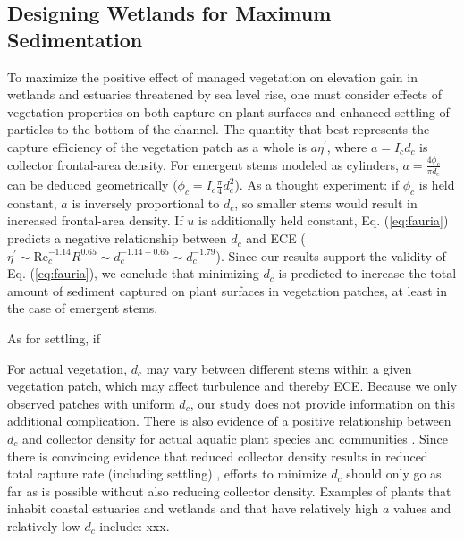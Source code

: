 \documentclass[geosciences,article,submit,moreauthors,pdftex]{Definitions/mdpi}
\newcommand\Rey{\mathrm{Re}}
\begin{document}
\subsection{Designing Wetlands for Maximum Sedimentation}

To maximize the positive effect of managed vegetation on elevation gain in wetlands and estuaries threatened by sea level rise, one must consider effects of vegetation properties on both capture on plant surfaces and enhanced settling of particles to the bottom of the channel. The quantity that best represents the capture efficiency of the vegetation patch as a whole is $a \eta^\prime$, where $a = I_cd_c$ is collector frontal-area density. For emergent stems modeled as cylinders, $a = \frac{4\phi_c}{\pi d_c}$ can be deduced geometrically ($\phi_c = I_c\frac{\pi}{4}d_c^2$). As a thought experiment: if $\phi_c$ is held constant, $a$ is inversely proportional to $d_c$, so smaller stems would result in increased frontal-area density. If $u$ is additionally held constant, Eq. (\ref{eq:fauria}) predicts a negative relationship between $d_c$ and ECE ($\eta^\prime \sim \Rey_c^{-1.14}R^{0.65} \sim d_c^{-1.14 - 0.65} \sim d_c^{-1.79}$). Since our results support the validity of Eq. (\ref{eq:fauria}), we conclude that minimizing $d_c$ is predicted to increase the total amount of sediment captured on plant surfaces in vegetation patches, at least in the case of emergent stems.

As for settling, if 

For actual vegetation, $d_c$ may vary between different stems within a given vegetation patch, which may affect turbulence and thereby ECE. Because we only observed patches with uniform $d_c$, our study does not provide information on this additional complication. There is also evidence of a positive relationship between $d_c$ and collector density for actual aquatic plant species and communities \cite{mudd2010does}. Since there is convincing evidence that reduced collector density results in reduced total capture rate (including settling) \cite{Fauria_2015}, efforts to minimize $d_c$ should only go as far as is possible without also reducing collector density. Examples of plants that inhabit coastal estuaries and wetlands and that have relatively high $a$ values and relatively low $d_c$ include: xxx.

\vspace{6pt} 

\end{document}
